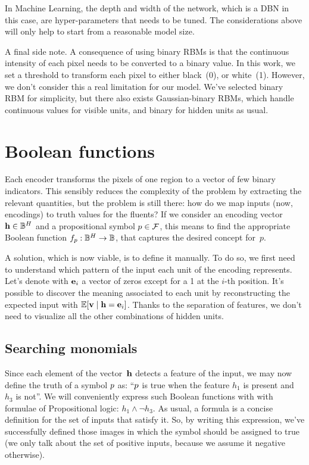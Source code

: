 In Machine Learning, the depth and width of the network, which is a DBN in
this case, are hyper-parameters that needs to be tuned. The considerations
above will only help to start from a reasonable model size.

A final side note. A consequence of using binary RBMs is that the continuous
intensity of each pixel needs to be converted to a binary value. In this work,
we set a threshold to transform each pixel to either black~(0), or white~(1).
However, we don't consider this a real limitation for our model. We've
selected binary RBM for simplicity, but there also exists Gaussian-binary
RBMs, which handle continuous values for visible units, and binary for hidden
units as usual.


\section{Boolean functions}

\label{sec:bool-fn}

Each encoder transforms the pixels of one region to a vector of few binary
indicators. This sensibly reduces the complexity of the problem by extracting
the relevant quantities, but the problem is still there: how do we map inputs
(now, encodings) to truth values for the fluents? If we consider an encoding
vector $\mathbf{h} \in \mathbb{B}^H$ and a propositional symbol $p \in \mathcal{F}$, this
means to find the appropriate Boolean function $f_p: \mathbb{B}^H \to \mathbb{B}$, that
captures the desired concept for~$p$.

A solution, which is now viable, is to define it manually.  To do so, we first
need to understand which pattern of the input each unit of the encoding
represents. Let's denote with $\mathbf{e}_i$ a vector of zeros except for a 1 at
the $i$-th position. It's possible to discover the meaning associated to each
unit by reconstructing the expected input with $\mathbb{E}[\mathbf{v} \mid \mathbf{h}=\mathbf{e}_i]$.
Thanks to the separation of features, we don't need to visualize all the other
combinations of hidden units.


\subsection{Searching monomials}

Since each element of the vector~$\mathbf{h}$ detects a feature of the input, we may
now define the truth of a symbol $p$ as: ``$p$ is true when the
feature $h_1$ is present and $h_3$ is not''. We will conveniently express such
Boolean functions with with formulae of Propositional logic: $h_1 \land \lnot
h_3$. As usual, a formula is a concise definition for the set of inputs that
satisfy it. So, by writing this expression, we've successfully defined those
images in which the symbol should be assigned to true (we only talk about the
set of positive inputs, because we assume it negative otherwise).

